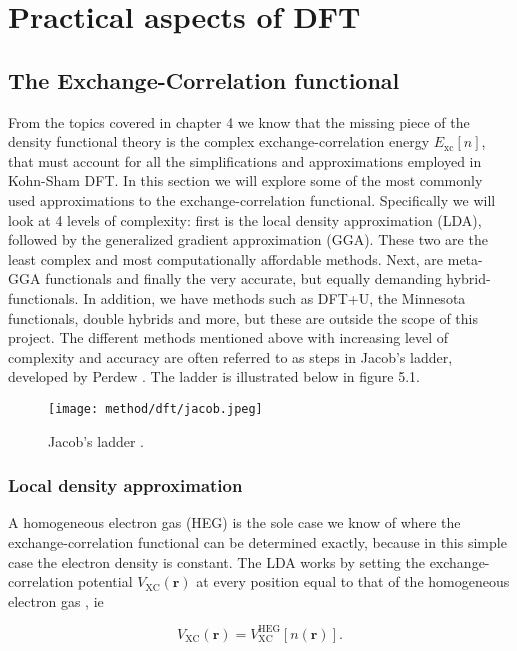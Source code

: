 \chapter{Practical aspects of DFT}
\label{sec:Practical DFT}

\section{The Exchange-Correlation functional}
From the topics covered in chapter 4 we know that the missing piece of the density functional theory is the complex exchange-correlation energy $E_{\text{xc}}[n]$, that must account for all the simplifications and approximations employed in Kohn-Sham DFT. In this section we will explore some of the most commonly used approximations to the exchange-correlation functional. Specifically we will look at 4 levels of complexity: first is the local density approximation (LDA), followed by the generalized gradient approximation (GGA). These two are the least complex and most computationally affordable methods. Next, are meta-GGA functionals and finally the very accurate, but equally demanding hybrid-functionals. In addition, we have methods such as DFT+U, the Minnesota functionals, double hybrids and more, but these are outside the scope of this project. The different methods mentioned above with increasing level of complexity and accuracy are often referred to as steps in Jacob's ladder, developed by Perdew \cite{jacob}. The ladder is illustrated below in figure 5.1. 

\begin{figure}[H]
\centering
\texttt{[image: method/dft/jacob.jpeg]}
\caption{Jacob's ladder \cite{jacob}.}
\end{figure}

   

\subsection{Local density approximation}
A homogeneous electron gas (HEG) is the sole case we know of where the exchange-correlation functional can be determined exactly, because in this simple case the electron density is constant. The LDA works by setting the exchange-correlation potential $V_\text{XC}(\boldsymbol{r})$ at every position equal to that of the homogeneous electron gas \cite{persson2020}, ie

\begin{equation}
V_\text{XC}(\boldsymbol{r}) = V_\text{XC} ^\text{HEG}[n(\boldsymbol{r})] .
\end{equation} 

